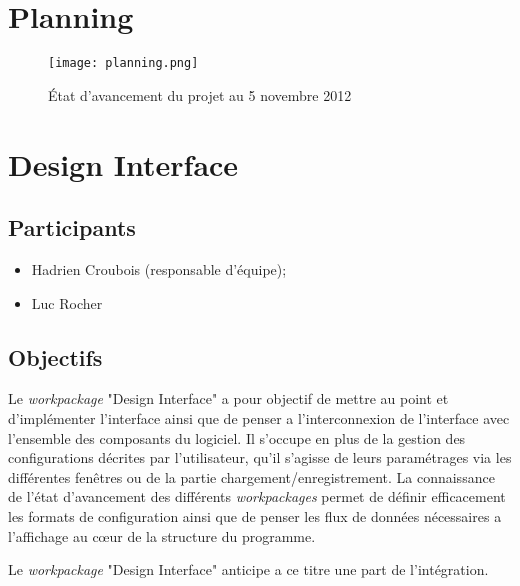 


\maketitle
\newpage

\tableofcontents
\newpage
\section{Planning}
\begin{figure}[h!]
	\centering
	\texttt{[image: planning.png]}
    \caption{État d'avancement du projet au 5 novembre 2012}
\end{figure}

\section{Design Interface}
\subsection{Participants}
\begin{itemize}
    \item Hadrien Croubois (responsable d'équipe);
    \item Luc Rocher
\end{itemize}
\subsection{Objectifs}
\par Le \emph{workpackage} "Design Interface" a pour objectif de mettre au point et d'implémenter l'interface ainsi que de penser a l’interconnexion de l'interface avec l'ensemble des composants du logiciel. Il s'occupe en plus de la gestion des configurations décrites par l'utilisateur, qu'il s'agisse de leurs paramétrages via les différentes fenêtres ou de la partie chargement/enregistrement. La connaissance de l'état d'avancement des différents \emph{workpackages} permet de définir efficacement les formats de configuration ainsi que de penser les flux de données nécessaires a l'affichage au cœur de la structure du programme.
\par Le \emph{workpackage} "Design Interface" anticipe a ce titre une part de l’intégration.
